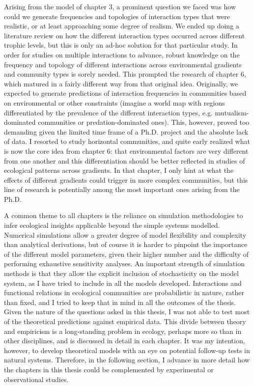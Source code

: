 Arising from the model of chapter 3, a prominent question we faced was how could we generate frequencies and topologies of interaction types that were realistic, or at least approaching some degree of realism. We ended up doing a literature review on how the different interaction types occurred across different trophic levels, but this is only an ad-hoc solution for that particular study. In order for studies on multiple interactions to advance, robust knowledge on the frequency and topology of different interactions across environmental gradients and community types is sorely needed. This prompted the research of chapter 6, which matured in a fairly different way from that original idea. Originally, we expected to generate predictions of interaction frequencies in communities based on environmental or other constraints (imagine a world map with regions differentiated by the prevalence of the different interaction types, e.g. mutualism-dominated communities or predation-dominated ones). This, however, proved too demanding given the limited time frame of a Ph.D. project and the absolute lack of data. I resorted to study horizontal communities, and quite early realized what is now the core idea from chapter 6: that environmental factors are very different from one another and this differentiation should be better reflected in studies of ecological patterns across gradients. In that chapter, I only hint at what the effects of different gradients could trigger in more complex communities, but this line of research is potentially among the most important ones arising from the Ph.D.

A common theme to all chapters is the reliance on simulation methodologies to infer ecological insights applicable beyond the simple systems modelled. Numerical simulations allow a greater degree of model flexibility and complexity than analytical derivations, but of course it is harder to pinpoint the importance of the different model parameters, given their higher number and the difficulty of performing exhaustive sensitivity analyses. An important strength of simulation methods is that they allow the explicit inclusion of stochasticity on the model system, as I have tried to include in all the models developed. Interactions and functional relations in ecological communities are probabilistic in nature, rather than fixed, and I tried to keep that in mind in all the outcomes of the thesis. Given the nature of the questions asked in this thesis, I was not able to test most of the theoretical predictions against empirical data. This divide between theory and empiricism is a long-standing problem in ecology, perhaps more so than in other disciplines, and is discussed in detail in each chapter. It was my intention, however, to develop theoretical models with an eye on potential follow-up tests in natural systems. Therefore, in the following section, I advance in more detail how the chapters in this thesis could be complemented by experimental or observational studies.

